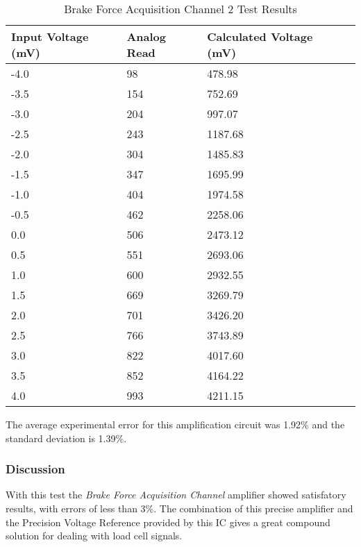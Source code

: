 				\begin{table}[h!]
				\centering
					\begin{tabular}{|l|l|l|l|}
						\hline
						\textbf{Input Voltage (mV)} & \textbf{Analog Read} & \textbf{Calculated Voltage (mV)} \\ \hline
						-4.0 & 98 & 478.98 \\ \hline
						-3.5 & 154 & 752.69 \\ \hline
						-3.0 & 204 & 997.07 \\ \hline
						-2.5 & 243 & 1187.68 \\ \hline
						-2.0 & 304 & 1485.83 \\ \hline
						-1.5 & 347 & 1695.99 \\ \hline
						-1.0 & 404 & 1974.58 \\ \hline
						-0.5 & 462 & 2258.06 \\ \hline
						 0.0 & 506 & 2473.12 \\ \hline
						 0.5 & 551 & 2693.06 \\ \hline
						 1.0 & 600 & 2932.55 \\ \hline
						 1.5 & 669 & 3269.79 \\ \hline
						 2.0 & 701 & 3426.20 \\ \hline
						 2.5 & 766 & 3743.89 \\ \hline
						 3.0 & 822 & 4017.60 \\ \hline
						 3.5 & 852 & 4164.22 \\ \hline
						 4.0 & 993 & 4211.15 \\ \hline
					\end{tabular}
					\caption{Brake Force Acquisition Channel 2 Test Results}
					\label{table:results-load2-test}
				\end{table}

			The average experimental error for this amplification circuit was 1.92$\%$ and the standard deviation is 1.39$\%$. 
		

	\subsubsection{Discussion}

		With this test the \textit{Brake Force Acquisition Channel} amplifier showed satisfatory results, with errors of less than 3$\%$. The combination of this precise amplifier and the Precision Voltage Reference provided by this IC gives a great compound solution for dealing with load cell signals.